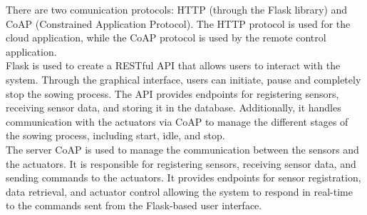There are two comunication protocols: HTTP (through the Flask library) and CoAP (Constrained Application Protocol). The HTTP protocol is used for the cloud application, while the CoAP protocol is used by the remote control application.\\
Flask is used to create a RESTful API that allows users to interact with the system. Through the graphical interface, users can initiate, pause and completely stop the sowing process. The API provides endpoints for registering sensors, receiving sensor data, and storing it in the database. Additionally, it handles communication with the actuators via CoAP to manage the different stages of the sowing process, including start, idle, and stop.\\

The server CoAP is used to manage the communication between the sensors and the actuators. It is responsible for registering sensors, receiving sensor data, and sending commands to the actuators. It provides endpoints for sensor registration, data retrieval, and actuator control allowing the system to respond in real-time to the commands sent from the Flask-based user interface.

